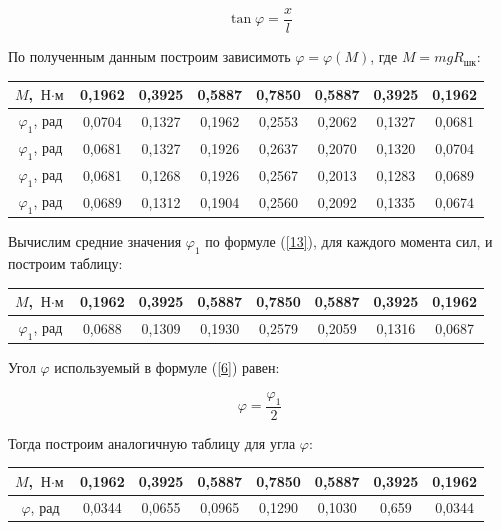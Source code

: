 \documentclass[12pt,a4paper]{article}
\begin{document}
\[ \tan \varphi = \frac{x}{l}\]

По полученным данным построим зависимоть $\varphi = \varphi(\textit{M})$, где $ \textit{M} = \textit{mg}\textit{R}_{\text{шк}}$:

\vspace{0,5cm}

\begin{tabular}{|c|c|c|c|c|c|c|c|}
\hline
$M$, $\text{Н} \cdot \text{м}$ & 0,1962 & 0,3925 & 0,5887 & 0,7850 & 0,5887 & 0,3925 & 0,1962 \\
\hline
$\varphi_1$, рад& 0,0704 & 0,1327 & 0,1962 & 0,2553 & 0,2062 & 0,1327 & 0,0681 \\
\hline
$\varphi_1$, рад& 0,0681 & 0,1327 & 0,1926 & 0,2637 & 0,2070 & 0,1320 & 0,0704 \\
\hline
$\varphi_1$, рад& 0,0681 & 0,1268 & 0,1926 & 0,2567 & 0,2013 & 0,1283 & 0,0689 \\
\hline
$\varphi_1$, рад& 0,0689 & 0,1312 & 0,1904 & 0,2560 & 0,2092 & 0,1335 & 0,0674 \\
\hline
\end{tabular}

\vspace{0,5cm}

Вычислим средние значения $\varphi_1$ по формуле (\ref{13}), для каждого момента сил, и построим таблицу:

\vspace{0,5cm}

\begin{tabular}{|c|c|c|c|c|c|c|c|}
\hline
$M$, $\text{Н} \cdot \text{м}$ & 0,1962 & 0,3925 & 0,5887 & 0,7850 & 0,5887 & 0,3925 & 0,1962 \\
\hline
$\varphi_1$, рад& 0,0688 & 0,1309 & 0,1930 & 0,2579 & 0,2059 & 0,1316 & 0,0687 \\
\hline
\end{tabular}

\vspace{0,5cm}

Угол $\varphi$ используемый в формуле (\ref{6}) равен:

\[\varphi = \frac{\varphi_1}{2}\]

Тогда построим аналогичную таблицу для угла $\varphi$:

\vspace{0,5cm}

\begin{tabular}{|c|c|c|c|c|c|c|c|}
\hline
$M$, $\text{Н} \cdot \text{м}$ & 0,1962 & 0,3925 & 0,5887 & 0,7850 & 0,5887 & 0,3925 & 0,1962 \\
\hline
$\varphi$, рад& 0,0344 & 0,0655 & 0,0965 & 0,1290 & 0,1030 & 0,659 & 0,0344 \\
\hline
\end{tabular}
\end{document}
